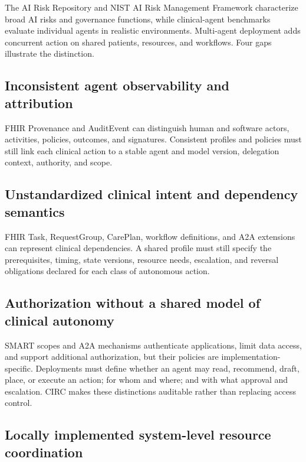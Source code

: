 \documentclass[10pt]{article}
\begin{document}
The AI Risk Repository and NIST AI Risk Management Framework characterize broad AI risks and
governance functions, while clinical-agent benchmarks evaluate individual agents in realistic
environments.\cite{slattery2024risk,nist2023airmf,jiang2025medagentbench,ferber2025oncology}
Multi-agent deployment adds concurrent action on shared patients, resources, and workflows. Four
gaps illustrate the distinction.

\subsection*{Inconsistent agent observability and attribution}

FHIR Provenance and AuditEvent can distinguish human and software actors, activities, policies,
outcomes, and signatures. Consistent profiles and policies must still link each clinical action to a
stable agent and model version, delegation context, authority, and scope.

\subsection*{Unstandardized clinical intent and dependency semantics}

FHIR Task, RequestGroup, CarePlan, workflow definitions, and A2A extensions can represent clinical
dependencies. A shared profile must still specify the prerequisites, timing, state versions, resource
needs, escalation, and reversal obligations declared for each class of autonomous action.

\subsection*{Authorization without a shared model of clinical autonomy}

SMART scopes and A2A mechanisms authenticate applications, limit data access, and support additional
authorization, but their policies are implementation-specific. Deployments must define whether an
agent may read, recommend, draft, place, or execute an action; for whom and where; and with what
approval and escalation. CIRC makes these distinctions auditable rather than replacing access control.

\subsection*{Locally implemented system-level resource coordination}
\end{document}
